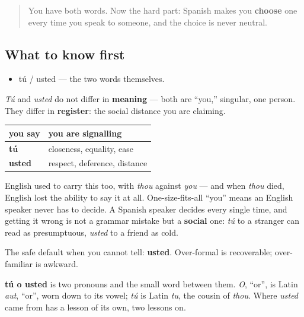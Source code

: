 \label{lesson:ES-C03-tu-usted-register}



\begin{quote}
You have both words. Now the hard part: Spanish makes you \textbf{choose} one every time you speak to someone, and the choice is never neutral.
\end{quote}

\subsection*{What to know first}
\begin{itemize}
\raggedright
  \item tú / usted — the two words themselves.
\end{itemize}

\begin{culture}
\emph{Tú} and \emph{usted} do not differ in \textbf{meaning} — both are \textquotedblleft{}you,\textquotedblright{} singular, one person. They differ in \textbf{register}: the social distance you are claiming.

\noindent
\begin{tabularx}{\linewidth}{@{}>{\raggedright\arraybackslash}X>{\raggedright\arraybackslash}X@{}}
\toprule
\textbf{you say} & \textbf{you are signalling} \\
\midrule
\textbf{tú} & closeness, equality, ease \\
\textbf{usted} & respect, deference, distance \\
\bottomrule
\end{tabularx}

English used to carry this too, with \emph{thou} against \emph{you} — and when \emph{thou} died, English lost the ability to say it at all. One-size-fits-all \textquotedblleft{}you\textquotedblright{} means an English speaker never has to decide. A Spanish speaker decides every single time, and getting it wrong is not a grammar mistake but a \textbf{social} one: \emph{tú} to a stranger can read as presumptuous, \emph{usted} to a friend as cold.

The safe default when you cannot tell: \textbf{usted}. Over-formal is recoverable; over-familiar is awkward.
\end{culture}

\begin{cousinweb}
\textbf{tú o usted} is two pronouns and the small word between them. \emph{O}, \textquotedblleft{}or\textquotedblright{}, is Latin \emph{aut}, \textquotedblleft{}or\textquotedblright{}, worn down to its vowel; \emph{tú} is Latin \emph{tu}, the cousin of \emph{thou}. Where \emph{usted} came from has a lesson of its own, two lessons on.
\end{cousinweb}

